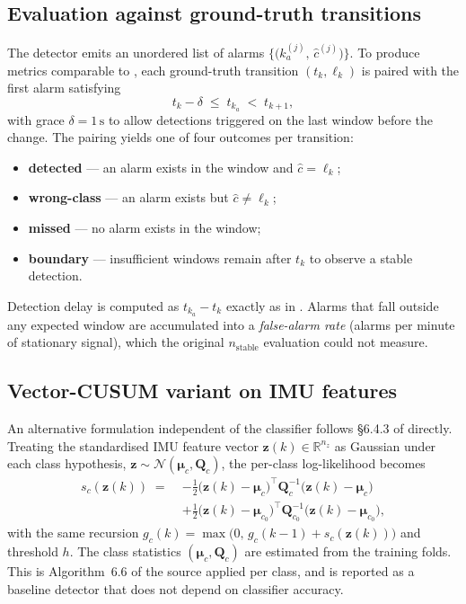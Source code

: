 \subsection{Evaluation against ground-truth transitions}
\label{sec:cusum_evaluation}

The detector emits an unordered list of alarms
$\bigl\{\bigl(k_a^{(j)},\,\hat{c}^{(j)}\bigr)\bigr\}$. To produce metrics
comparable to , each ground-truth transition
$(t_k,\ell_k)$ is paired with the first alarm satisfying
\begin{equation}
  t_k - \delta \;\le\; t_{k_a} \;<\; t_{k+1},
\end{equation}
with grace $\delta = 1\,\text{s}$ to allow detections triggered on the last
window before the change. The pairing yields one of four outcomes per
transition:
\begin{itemize}
  \item \textbf{detected} --- an alarm exists in the window and
        $\hat{c} = \ell_k$;
  \item \textbf{wrong-class} --- an alarm exists but $\hat{c}\neq\ell_k$;
  \item \textbf{missed} --- no alarm exists in the window;
  \item \textbf{boundary} --- insufficient windows remain after $t_k$ to
        observe a stable detection.
\end{itemize}
Detection delay is computed as $t_{k_a} - t_k$ exactly as in
. Alarms that fall outside any expected window
are accumulated into a \emph{false-alarm rate} (alarms per minute of
stationary signal), which the original $n_{\text{stable}}$ evaluation could
not measure.

\subsection{Vector-CUSUM variant on IMU features}
\label{sec:cusum_vector}

An alternative formulation independent of the classifier follows \S6.4.3 of
\cite{Blanke2003} directly. Treating the standardised IMU feature vector
$\mathbf{z}(k)\in\mathbb{R}^{n_z}$ as Gaussian under each class hypothesis,
$\mathbf{z}\sim\mathcal{N}(\boldsymbol{\mu}_c,\mathbf{Q}_c)$, the per-class
log-likelihood becomes
\begin{equation}
\begin{split}
  s_c(\mathbf{z}(k)) \;=\;
    &-\tfrac{1}{2}\bigl(\mathbf{z}(k)-\boldsymbol{\mu}_c\bigr)^{\!\top}
      \mathbf{Q}_c^{-1}\bigl(\mathbf{z}(k)-\boldsymbol{\mu}_c\bigr) \\
    &+\tfrac{1}{2}\bigl(\mathbf{z}(k)-\boldsymbol{\mu}_{c_0}\bigr)^{\!\top}
      \mathbf{Q}_{c_0}^{-1}\bigl(\mathbf{z}(k)-\boldsymbol{\mu}_{c_0}\bigr),
\end{split}
\label{eq:cusum_vector}
\end{equation}
with the same recursion
$g_c(k)=\max\!\bigl(0,\,g_c(k-1)+s_c(\mathbf{z}(k))\bigr)$ and threshold $h$.
The class statistics $(\boldsymbol{\mu}_c,\mathbf{Q}_c)$ are estimated from
the training folds. This is Algorithm~6.6 of the source applied per class,
and is reported as a baseline detector that does not depend on classifier
accuracy.